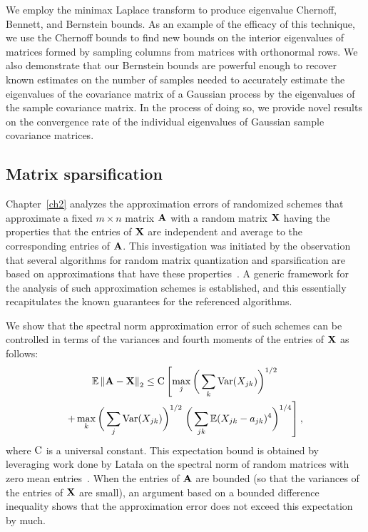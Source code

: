We employ the minimax Laplace transform to produce eigenvalue Chernoff, 
Bennett, and Bernstein bounds. As an example of the efficacy of this technique,
we use the Chernoff bounds to find new bounds on the interior eigenvalues of 
matrices formed by sampling columns from matrices with orthonormal rows. We 
also demonstrate that our Bernstein bounds are powerful enough to recover known
estimates on the number of samples needed to accurately estimate the eigenvalues 
of the covariance matrix of a Gaussian process by the eigenvalues of the sample
covariance matrix. In the process of doing so, we provide novel results on the convergence rate of the
individual eigenvalues of Gaussian sample covariance matrices.


\subsection{Matrix sparsification}

Chapter~\ref{ch2} analyzes the approximation errors of randomized 
schemes that approximate a fixed $m \times n$ matrix $\mathbf{A}$ with a random
matrix $\mathbf{X}$ having the properties that the entries of $\mathbf{X}$ are 
independent and average to the corresponding entries of $\mathbf{A}$. This 
investigation was initiated by the observation that several algorithms for 
random matrix quantization and sparsification are based on approximations that
have these properties~\cite{AM01,AHK06,AM07}. A generic framework for the 
analysis of such approximation schemes is established, and this essentially
recapitulates the known guarantees for the referenced algorithms. 

We show that the spectral norm approximation error of such schemes can be controlled in terms 
of the variances and fourth moments of the entries of $\mathbf{X}$ as follows:
\begin{multline}
 \mathbb{E}\left\|\mathbf{A} - \mathbf{X}\right\|_2 \leq \mathrm{C}\left[\max_j\bigg(\sum_k \operatorname{Var}(X_{jk})
 \bigg)^{1/2} \right. \\
  + \max_k \bigg(\sum_j \operatorname{Var}(X_{jk})\bigg)^{1/2} 
  \left.  \bigg(\sum_{jk} \mathbb{E}(X_{jk} - a_{jk})^4 \bigg)^{1/4} \right],
 \label{eqn:expected-spectral-sparsification-error}
\end{multline}
where $\mathrm{C}$ is a universal constant. This expectation bound is obtained 
by leveraging work done by Lata{\l}a on the spectral norm of random matrices 
with zero mean entries~\cite{Lat04}. When the entries of $\mathbf{A}$ are bounded (so that the variances of the entries
of $\mathbf{X}$ are small), an argument based on a bounded difference inequality
shows that the approximation error does not exceed this expectation by much. 

